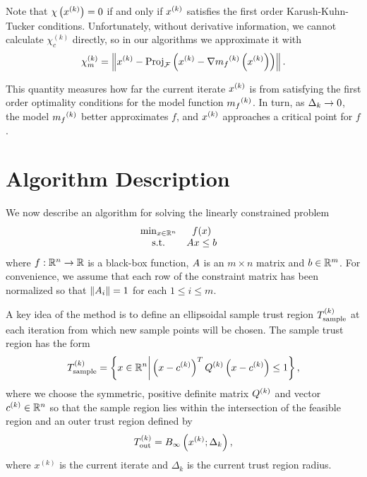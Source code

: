 \documentclass{article}
\begin{document}
Note that $\chi\left(x^{(k)}\right) = 0$ if and only if $x^{(k)}$ satisfies the first order Karush-Kuhn-Tucker conditions.
Unfortunately,  without derivative information, we cannot calculate $\chi_c^{(k)}$ directly,
so in our algorithms we approximate it with
\begin{align}
\label{define_criticality_measure}
{\chi_m^{(k)}} = \left\|x^{(k)} - {\textrm{Proj}}_{{\mathcal F}}\left(x^{(k)}- \nabla {{m}_f}^{(k)}\left(x^{(k)}\right)\right)\right\|.
\end{align}

This quantity measures how far the current iterate $x^{(k)}$ is from satisfying the first order optimality conditions for the model function ${{m}_f}^{(k)}$.
In turn, as $\Delta_k \to 0$, the model ${{m}_f}^{(k)}$ better approximates $f$,  and $x^{(k)}$ approaches a critical point for $f$.









\section{Algorithm Description}
\label{sec:linear}
We now describe an algorithm for solving the linearly constrained problem
\begin{align}
\label{eq:DFO-linear}
\begin{array}{ccl} \min_{x \in \mathbb R^n} & f(x) \\
\textrm{s.t.} & {A} x \le {b} & 
\end{array}
\end{align}
where $f:\mathbb R^n\rightarrow\mathbb R$ is a black-box function, 
${A}$ is an $m \times n$ matrix and ${b} \in \mathbb R^m$.
For convenience, we assume that each row of the constraint matrix has been normalized so that
$\left\|{A}_i\right\| = 1$ for each $1 \le i \le m$.


A key idea of the method is to define an ellipsoidal sample trust region ${T_{\text{sample}}^{(k)}}$ at each iteration from which new sample points will be chosen.   The sample trust region has the form
\begin{equation}
\label{define_the_sample_region}
{T_{\text{sample}}^{(k)}} = \left\{x \in \mathbb R^n \bigg | \left(x - c^{(k)}\right)^T {Q^{(k)}} \left(x - c^{(k)}\right) \le 1 \right\},
\end{equation}
where we choose the symmetric, positive definite matrix ${Q^{(k)}}$ and vector $c^{(k)} \in \mathbb R^n$ so that
the sample region lies within the intersection of the feasible region and an outer trust region defined by
\begin{equation}
\label{define_outer_trust_region}
{T_{\text{out}}^{(k)}} = B_{\infty}\left(x^{(k)};\Delta_k\right),
\end{equation}
where $x^{(k)}$ is the current iterate and $\Delta_k$ is the current trust region radius.
\end{document}

